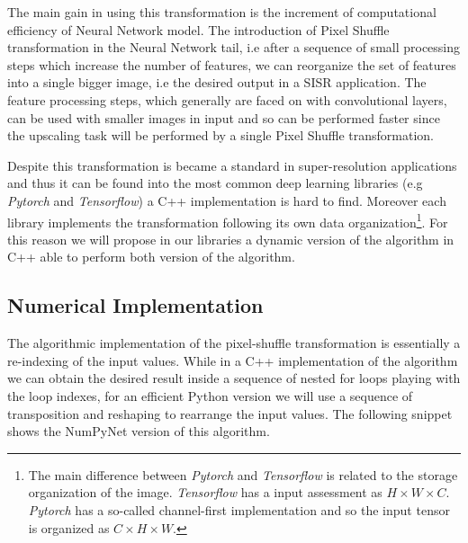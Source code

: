 \documentclass{standalone}
\begin{document}
The main gain in using this transformation is the increment of computational efficiency of Neural Network model.
The introduction of Pixel Shuffle transformation in the Neural Network tail, i.e after a sequence of small processing steps which increase the number of features, we can reorganize the set of features into a single bigger image, i.e the desired output in a SISR application.
The feature processing steps, which generally are faced on with convolutional layers, can be used with smaller images in input and so can be performed faster since the upscaling task will be performed by a single Pixel Shuffle transformation.

Despite this transformation is became a standard in super-resolution applications and thus it can be found into the most common deep learning libraries (e.g \emph{Pytorch} and \emph{Tensorflow}) a C++ implementation is hard to find.
Moreover each library implements the transformation following its own data organization\footnote{
  The main difference between \emph{Pytorch} and \emph{Tensorflow} is related to the storage organization of the image.
  \emph{Tensorflow} has a  input assessment as $H \times W \times C$.
  \emph{Pytorch} has a so-called channel-first implementation and so the input tensor is organized as $C \times H \times W$.
}.
For this reason we will propose in our libraries a dynamic version of the algorithm in C++ able to perform both version of the algorithm.


\subsection[Numerical Implementation]{Numerical Implementation}\label{NN:shuffle_num}

The algorithmic implementation of the pixel-shuffle transformation is essentially a re-indexing of the input values.
While in a C++ implementation of the algorithm we can obtain the desired result inside a sequence of nested for loops playing with the loop indexes, for an efficient Python version we will use a sequence of transposition and reshaping to rearrange the input values.
The following snippet shows the NumPyNet version of this algorithm.
\end{document}
